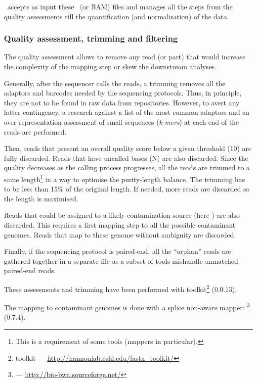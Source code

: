 \irap\ accepts as input these \fastq\ (or \gls{BAM}) files and manages all
the steps from the quality assessments till the quantification (and
normalisation) of the data.

\subsubsection{Quality assessment, trimming and filtering}

The quality assessment allows to remove any read (or part) that would increase
the complexity of the mapping step or skew the downstream analyses.

Generally, after the sequencer calls the reads, a trimming removes
all the adaptors and barcodes needed by the sequencing protocols. Thus,
in principle, they are not to be found in raw data from repositories.
However, to avert any latter contingency, a research against
a list of the most common adaptors and an over-representation assessment of small
sequences (\emph{k-mers}) at each end of the reads are performed.

Then, reads that present an overall quality score below a given threshold (10) are
fully discarded. Reads that have uncalled bases (\textsc{N}) are also discarded.
Since the quality decreases as the calling process progresses, all the reads are
trimmed to a same length\footnote{This is a requirement of some tools (mappers
in particular).} in a way to optimise the purity-length balance. The trimming has
to be less than 15\% of the original length. If needed, more reads are discarded
so the length is maximised.

Reads that could be assigned to a likely contamination source (here
) are also discarded. This requires a first mapping
step to all the possible contaminant genomes. Reads that map to these genome
without ambiguity are discarded.

Finally, if the sequencing protocol is paired-end, all the ``orphan'' reads are
gathered together in a separate file as a subset of tools mishandle unmatched
paired-end reads.

These assessments and trimming have been performed with 
toolkit\footnote{ toolkit ---
\href{http://hannonlab.cshl.edu/fastx\_toolkit/}%
{http://hannonlab.cshl.edu/fastx\_toolkit/}} (0.0.13).

The mapping to contaminant genomes is done with a splice non-aware mapper:
\footnote{ --- \href{http://bio-bwa.sourceforge.net/}%
{http://bio-bwa.sourceforge.net/}} (0.7.4).

